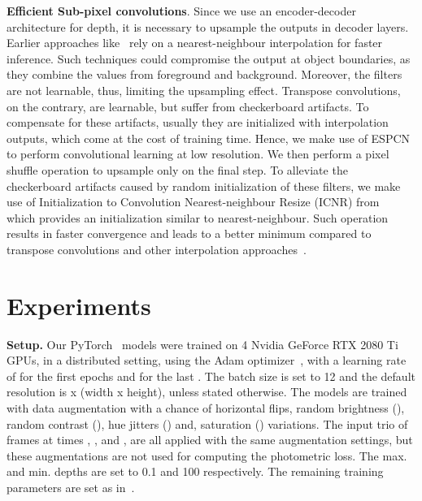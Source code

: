 \documentclass{bmvc2k}
\begin{document}
\textbf{Efficient Sub-pixel convolutions}. Since we use an encoder-decoder architecture for depth, it is necessary to upsample the outputs in decoder layers. Earlier approaches like~\cite{godard2019digging, zhou2017unsupervised, wang2018learning, yin2018geonet} rely on a nearest-neighbour interpolation for faster inference. Such techniques could compromise the output at object boundaries, as they combine the values from foreground and background. Moreover, the filters are not learnable, thus, limiting the upsampling effect. Transpose convolutions, on the contrary, are learnable, but suffer from checkerboard artifacts. To compensate for these artifacts, usually they are initialized with interpolation outputs, which come at the cost of training time. Hence, we make use of ESPCN~\cite{shi2016real} to perform convolutional learning at low resolution. We then perform a pixel shuffle operation to upsample only on the final step. To alleviate the checkerboard artifacts caused by random initialization of these filters, we make use of Initialization to Convolution Nearest-neighbour Resize (ICNR) from~\cite{aitken2017checkerboard} which provides an initialization similar to nearest-neighbour. Such operation results in faster convergence and leads to a better minimum compared to transpose convolutions and other interpolation approaches~\cite{shi2016real}.


\vspace{-13pt}
\section{Experiments}
\vspace{-5pt}
\label{sec:expts}
\textbf{Setup.} Our PyTorch~\cite{NEURIPS2019_9015} models were trained on 4 Nvidia GeForce RTX 2080 Ti GPUs, in a distributed setting, using the Adam optimizer~\cite{kingma2014adam}, with a learning rate of  for the first  epochs and  for the last . The batch size is set to 12 and the default resolution is x (width x height), unless stated otherwise. The models are trained with data augmentation with a  chance of horizontal flips, random brightness (), random contrast (), hue jitters () and, saturation () variations. The input trio of frames at times , , and , are all applied with the same augmentation settings, but these augmentations are not used for computing the photometric loss. The max. and min. depths are set to 0.1 and 100 respectively. The remaining training parameters are set as in~\cite{godard2019digging}.

\vspace{-10pt}
\end{document}

